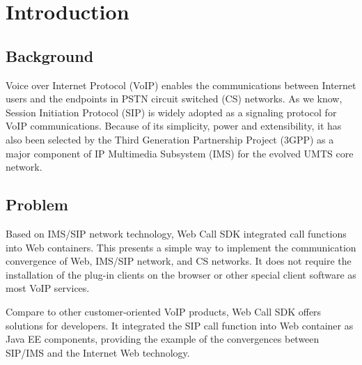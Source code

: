 \chapter{Introduction}
\label{sec:Introduction}


\section{Background}
\label{sec:Introduction:Background}

Voice over Internet Protocol (VoIP)\label{sym:VoIP} enables the communications between Internet users and the endpoints in PSTN circuit switched (CS)\label{sym:CS} networks. As we know, Session Initiation Protocol (SIP)\label{sym:SIP} is widely adopted as a signaling protocol for VoIP communications. Because of its simplicity, power and extensibility, it has also been selected by the Third Generation Partnership Project (3GPP)\label{sym:3GPP} as a major component of IP Multimedia Subsystem (IMS)\label{sym:IMS} for the evolved UMTS core network. 

\section{Problem}
\label{sec:Introduction:Problem}




Based on IMS/SIP network technology, Web Call SDK integrated call functions into Web containers. This presents a simple way to implement the communication convergence of Web, IMS/SIP network, and CS networks. It does not require the installation of the plug-in clients on the browser or other special client software as most VoIP services.

Compare to other customer-oriented VoIP products, Web Call SDK offers solutions for developers. It integrated the SIP call function into Web container as Java EE components, providing the example of the convergences between SIP/IMS and the Internet Web technology.




